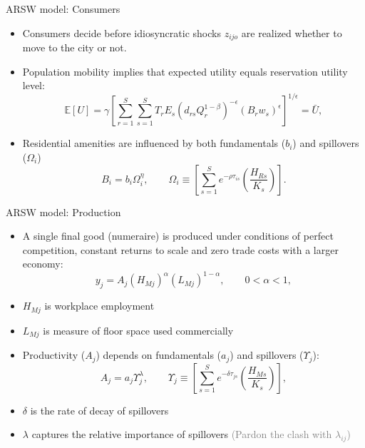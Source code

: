 \documentclass[11pt,notes=hide,aspectratio=169]{beamer}
\begin{document}
\begin{frame}{ARSW model: Consumers}
\begin{itemize}
\item Consumers decide before idiosyncratic shocks  $z_{ijo}$  are realized whether to move to the city or not.
\item Population mobility implies that expected utility equals reservation utility level:
\begin{equation*} \label{eq:pm}
\mathbb{E} \left[ U \right]  = \gamma \left[ \sum_{r=1}^{S} \sum_{s=1}^{S} T_{r} E_{s} \left( d_{rs}
Q_{r}^{1-\beta} \right)^{-\epsilon} \left( B_{r} w_{s} \right)^{\epsilon} %
\right]^{1/\epsilon} = \bar{U},  
\end{equation*}
\item Residential amenities are influenced by both fundamentals ($b_{i}$) and spillovers ($\Omega_{i}$)
\[
 B_{i} = b_{i} \Omega_{i}^{\eta}, \qquad \Omega_{i} \equiv \left[ \sum\limits_{s=1}^{S} e^{-\rho \tau_{is}} \left( \frac{H_{Rs}}{K_s} \right) \right].
\]
\end{itemize}
\end{frame}
\begin{frame}{ARSW model: Production}
\begin{itemize}
\item A single final good (numeraire) is produced under conditions of perfect competition, constant returns to scale and zero trade costs with a larger economy:
\[
y_{j} = A_{j} \left( H_{Mj} \right)^{\alpha} \left( L_{Mj} \right)^{1-\alpha},\qquad 0<\alpha <1,
\]
\item $H_{Mj}$ is workplace employment 
\item $L_{Mj}$ is measure of floor space used commercially
\item Productivity ($A_j$) depends on fundamentals ($a_j$) and spillovers ($\Upsilon_{j}$):
\[
A_{j} = a_{j} \Upsilon_{j}^{\lambda}, \qquad \Upsilon_{j} \equiv \left[ \sum\limits_{s=1}^{S} e^{-\delta \tau_{js}} \left( \frac{H_{Ms}}{K_s} \right) \right],
\]
\item $\delta$ is the rate of decay of spillovers
\item $\lambda$ captures the relative importance of spillovers
\textcolor{gray}{(Pardon the clash with $\lambda_{ij}$)}
\end{itemize}
\end{frame}
\end{document}
